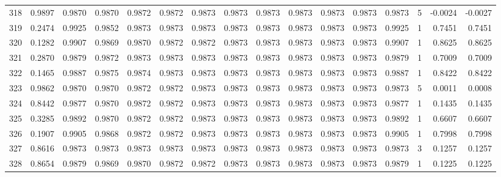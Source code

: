 \begin{tabular}{lrrrrrrrrrrrrrrr}
318 &      0.9897 &  0.9870 &  0.9870 &  0.9872 &  0.9872 &  0.9873 &  0.9873 &  0.9873 &  0.9873 &  0.9873 &   0.9873 &     0.9873 &      5 &                   -0.0024 &                    -0.0027 \\
319 &      0.2474 &  0.9925 &  0.9852 &  0.9873 &  0.9873 &  0.9873 &  0.9873 &  0.9873 &  0.9873 &  0.9873 &   0.9873 &     0.9925 &      1 &                    0.7451 &                     0.7451 \\
320 &      0.1282 &  0.9907 &  0.9869 &  0.9870 &  0.9872 &  0.9872 &  0.9873 &  0.9873 &  0.9873 &  0.9873 &   0.9873 &     0.9907 &      1 &                    0.8625 &                     0.8625 \\
321 &      0.2870 &  0.9879 &  0.9872 &  0.9873 &  0.9873 &  0.9873 &  0.9873 &  0.9873 &  0.9873 &  0.9873 &   0.9873 &     0.9879 &      1 &                    0.7009 &                     0.7009 \\
322 &      0.1465 &  0.9887 &  0.9875 &  0.9874 &  0.9873 &  0.9873 &  0.9873 &  0.9873 &  0.9873 &  0.9873 &   0.9873 &     0.9887 &      1 &                    0.8422 &                     0.8422 \\
323 &      0.9862 &  0.9870 &  0.9870 &  0.9872 &  0.9872 &  0.9873 &  0.9873 &  0.9873 &  0.9873 &  0.9873 &   0.9873 &     0.9873 &      5 &                    0.0011 &                     0.0008 \\
324 &      0.8442 &  0.9877 &  0.9870 &  0.9872 &  0.9872 &  0.9873 &  0.9873 &  0.9873 &  0.9873 &  0.9873 &   0.9873 &     0.9877 &      1 &                    0.1435 &                     0.1435 \\
325 &      0.3285 &  0.9892 &  0.9870 &  0.9872 &  0.9872 &  0.9873 &  0.9873 &  0.9873 &  0.9873 &  0.9873 &   0.9873 &     0.9892 &      1 &                    0.6607 &                     0.6607 \\
326 &      0.1907 &  0.9905 &  0.9868 &  0.9872 &  0.9872 &  0.9873 &  0.9873 &  0.9873 &  0.9873 &  0.9873 &   0.9873 &     0.9905 &      1 &                    0.7998 &                     0.7998 \\
327 &      0.8616 &  0.9873 &  0.9873 &  0.9873 &  0.9873 &  0.9873 &  0.9873 &  0.9873 &  0.9873 &  0.9873 &   0.9873 &     0.9873 &      3 &                    0.1257 &                     0.1257 \\
328 &      0.8654 &  0.9879 &  0.9869 &  0.9870 &  0.9872 &  0.9872 &  0.9873 &  0.9873 &  0.9873 &  0.9873 &   0.9873 &     0.9879 &      1 &                    0.1225 &                     0.1225 \\

\end{tabular}
